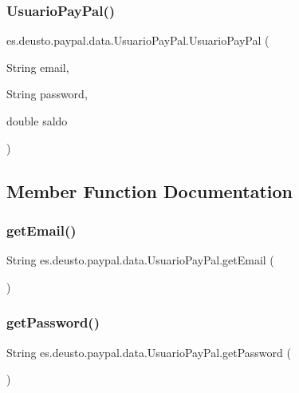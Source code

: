 \subsubsection{\texorpdfstring{UsuarioPayPal()}{UsuarioPayPal()}}
{\footnotesize\ttfamily es.\+deusto.\+paypal.\+data.\+Usuario\+Pay\+Pal.\+Usuario\+Pay\+Pal (\begin{DoxyParamCaption}\item[{String}]{email,  }\item[{String}]{password,  }\item[{double}]{saldo }\end{DoxyParamCaption})}



\subsection{Member Function Documentation}
\mbox{\label{classes_1_1deusto_1_1paypal_1_1data_1_1_usuario_pay_pal_a259df2056bc8dbe885cb6f6c5e9efd72}} 
\subsubsection{\texorpdfstring{getEmail()}{getEmail()}}
{\footnotesize\ttfamily String es.\+deusto.\+paypal.\+data.\+Usuario\+Pay\+Pal.\+get\+Email (\begin{DoxyParamCaption}{ }\end{DoxyParamCaption})}

\mbox{\label{classes_1_1deusto_1_1paypal_1_1data_1_1_usuario_pay_pal_aa05a592df14b4866258c39da3eab4793}} 
\subsubsection{\texorpdfstring{getPassword()}{getPassword()}}
{\footnotesize\ttfamily String es.\+deusto.\+paypal.\+data.\+Usuario\+Pay\+Pal.\+get\+Password (\begin{DoxyParamCaption}{ }\end{DoxyParamCaption})}

